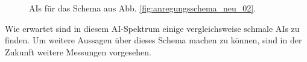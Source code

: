 \begin{figure}[hp]
 	\centering
 	\footnotesize
	\caption[AIs, neues System, Schema (2)]{AIs für das Schema aus Abb.
\ref{fig:anregungsschema_neu_02}.}
\label{fig:linienscans_neues_schema_02_AIs}
\end{figure}
Wie erwartet sind in diesem AI-Spektrum einige vergleichsweise schmale AIs zu
finden. Um weitere Aussagen über dieses Schema machen zu können, sind in der
Zukunft weitere Messungen vorgesehen.

